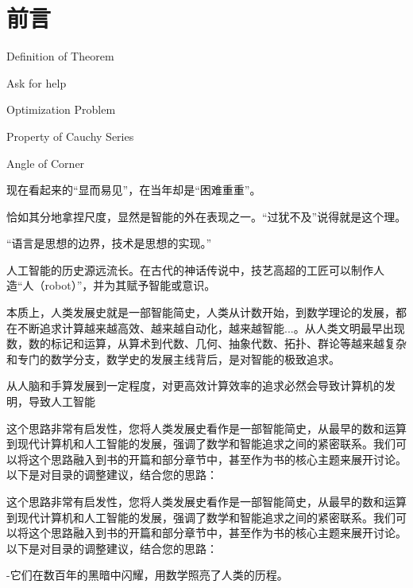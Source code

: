 \chapter*{ 前言}


 \begin{introduction}
  \item Definition of Theorem
  \item Ask for help
  \item Optimization Problem
  \item Property of Cauchy Series
  \item Angle of Corner
\end{introduction}

现在看起来的“显而易见”，在当年却是“困难重重”。


恰如其分地拿捏尺度，显然是智能的外在表现之一。“过犹不及”说得就是这个理。



“语言是思想的边界，技术是思想的实现。”


人工智能的历史源远流长。在古代的神话传说中，技艺高超的工匠可以制作人造“人（robot）”，并为其赋予智能或意识。



本质上，人类发展史就是一部智能简史，人类从计数开始，到数学理论的发展，都在不断追求计算越来越高效、越来越自动化，越来越智能...。从人类文明最早出现数，数的标记和运算，从算术到代数、几何、抽象代数、拓扑、群论等越来越复杂和专门的数学分支，数学史的发展主线背后，是对智能的极致追求。



从人脑和手算发展到一定程度，对更高效计算效率的追求必然会导致计算机的发明，导致人工智能



这个思路非常有启发性，您将人类发展史看作是一部智能简史，从最早的数和运算到现代计算机和人工智能的发展，强调了数学和智能追求之间的紧密联系。我们可以将这个思路融入到书的开篇和部分章节中，甚至作为书的核心主题来展开讨论。以下是对目录的调整建议，结合您的思路：



这个思路非常有启发性，您将人类发展史看作是一部智能简史，从最早的数和运算到现代计算机和人工智能的发展，强调了数学和智能追求之间的紧密联系。我们可以将这个思路融入到书的开篇和部分章节中，甚至作为书的核心主题来展开讨论。以下是对目录的调整建议，结合您的思路：




-它们在数百年的黑暗中闪耀，用数学照亮了人类的历程。

